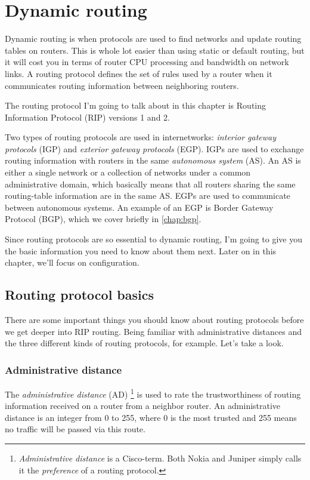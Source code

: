 \section{Dynamic routing}

Dynamic routing is when protocols are used to find networks and update
routing tables on routers. This is whole lot easier than using static or
default routing, but it will cost you in terms of router CPU processing
and bandwidth on network links. A routing protocol defines the set of
rules used by a router when it communicates routing information between
neighboring routers.

The routing protocol I'm going to talk about in this chapter is Routing
Information Protocol (RIP) versions 1 and 2.

Two types of routing protocols are used in internetworks: \emph{interior gateway protocols} (IGP) and \emph{exterior gateway protocols} (EGP).
IGPs are used to exchange routing information with routers in the same \emph{autonomous system} (AS).
An AS is either a single network or a collection of networks under a common administrative domain,
which basically means that all routers sharing the same routing-table information are in the same AS.
EGPs are used to communicate between autonomous systems.
An example of an EGP is Border Gateway Protocol (BGP), which we cover briefly in \cref{chap:bgp}.

Since routing protocols are so essential to dynamic routing, I'm going to give you the basic information you need to know about them next.
Later on in this chapter, we'll focus on configuration.

\subsection{Routing protocol basics}

There are some important things you should know about routing protocols before we get deeper into RIP routing.
Being familiar with administrative distances and the three different kinds of routing protocols, for example. Let's take a look.

\subsubsection{Administrative distance}

The \emph{administrative distance} (AD)%
   \footnote{\emph{Administrative distance} is a Cisco-term. Both Nokia and Juniper simply calls it the \emph{preference} of a routing protocol.}%
is used to rate the trustworthiness of routing information received on a router from a neighbor router.
An administrative distance is an integer from 0 to 255, where 0 is the most trusted and 255 means no traffic will be passed via this route.

